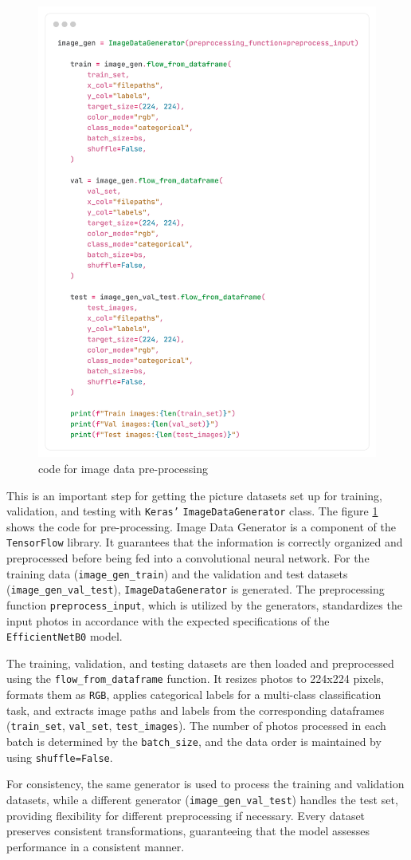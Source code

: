 \documentclass[12pt,onecolumn]{report}
\begin{document}
\begin{itemize}
\begin{figure}[h!]
        \includegraphics[width=0.6\columnwidth]{figures/imp_data_preprocessing.png}  %
        \caption{code for image data pre-processing} %
        \label{fig:imp_data_preprocessing} %
    \end{figure}
    This is an important step for getting the picture datasets set up for training, validation, and testing with \texttt{Keras'} \texttt{ImageDataGenerator} class. The figure \ref{fig:imp_data_preprocessing} shows the code for pre-processing. Image Data Generator is a component of the \texttt{TensorFlow} library. It guarantees that the information is correctly organized and preprocessed before being fed into a convolutional neural network. For the training data (\texttt{image\_gen\_train}) and the validation and test datasets (\texttt{image\_gen\_val\_test}), \texttt{ImageDataGenerator} is generated. The preprocessing function \texttt{preprocess\_input}, which is utilized by the generators, standardizes the input photos in accordance with the expected specifications of the \texttt{Effici\newline entNetB0} model. 

    The training, validation, and testing datasets are then loaded and preprocessed using the \texttt{flow\_from\_dataf\newline rame} function. It resizes photos to 224x224 pixels, formats them as \texttt{RGB}, applies categorical labels for a multi-class classification task, and extracts image paths and labels from the corresponding dataframes (\texttt{train\_set}, \texttt{val\_set}, \texttt{test\_images}). The number of photos processed in each batch is determined by the \texttt{batch\_size}, and the data order is maintained by using \texttt{shuffle=False}.
    
    For consistency, the same generator is used to process the training and validation datasets, while a different generator (\texttt{image\_gen\_val\_test}) handles the test set, providing flexibility for different preprocessing if necessary. Every dataset preserves consistent transformations, guaranteeing that the model assesses performance in a consistent manner.
\end{itemize}
\end{document}
